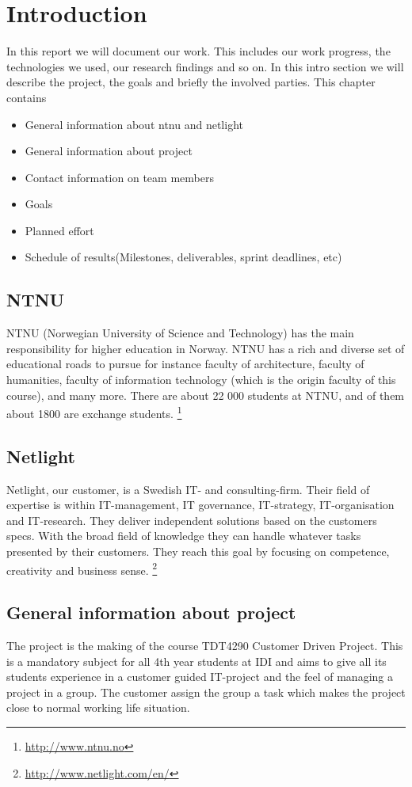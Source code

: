 \chapter{Introduction}
In this report we will document our work. This includes our work progress, the technologies we used, our research findings and so on. In this intro section we will describe the project, the goals and briefly the involved parties.
    This chapter contains
\begin{itemize}
\item General information about ntnu and netlight
\item General information about project
\item Contact information on team members
\item Goals
\item Planned effort
\item Schedule of results(Milestones, deliverables, sprint deadlines, etc)
\end{itemize}

\section{NTNU}
NTNU (Norwegian University of Science and Technology) has the main responsibility for higher education in Norway. NTNU has a rich and diverse set of educational roads to pursue for instance faculty of architecture, faculty of humanities, faculty of information technology (which is the origin faculty of this course), and many more. There are about 22 000 students at NTNU, and of them about 1800 are exchange students. 
\footnote{\url{http://www.ntnu.no}}

\section{Netlight}
Netlight, our customer, is a Swedish IT- and consulting-firm. Their field of expertise is within IT-management, IT governance, IT-strategy, IT-organisation and IT-research. They deliver independent solutions based on the customers specs. With the broad field of knowledge they can handle whatever tasks presented by their customers. They reach this goal by focusing on competence, creativity and business sense.
\footnote{\url{http://www.netlight.com/en/}}

\section{General information about project}
The project is the making of the course TDT4290 Customer Driven Project. This is a mandatory subject for all 4th year students at IDI and aims to give all its students experience in a customer guided IT-project and the feel of managing a project in a group. The customer assign the group a task which makes the project close to normal working life situation.

